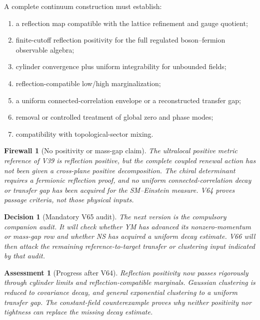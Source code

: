 \documentclass[11pt]{article}
\newtheorem{assessment}[theorem]{Assessment}
\newtheorem{firewall}[theorem]{Firewall}
\newtheorem{decision}[theorem]{Decision}
\begin{document}
\begin{ledger}
\label{led:v11v64-data}
A complete continuum construction must establish:
\begin{enumerate}
\item a reflection map compatible with the lattice refinement and
gauge quotient;
\item finite-cutoff reflection positivity for the full regulated
boson--fermion observable algebra;
\item cylinder convergence plus uniform integrability for unbounded
fields;
\item reflection-compatible low/high marginalization;
\item a uniform connected-correlation envelope or a reconstructed
transfer gap;
\item removal or controlled treatment of global zero and phase modes;
\item compatibility with topological-sector mixing.
\end{enumerate}
\end{ledger}

\begin{firewall}[No positivity or mass-gap claim]
\label{fire:v11v64-boundary}
The ultralocal positive metric reference of V39 is reflection positive,
but the complete coupled renewal action has not been given a
cross-plane positive decomposition.  The chiral determinant requires
a fermionic reflection proof, and no uniform connected-correlation
decay or transfer gap has been acquired for the SM--Einstein measure.
V64 proves passage criteria, not those physical inputs.
\end{firewall}

\begin{decision}[Mandatory V65 audit]
\label{dec:v11v64-next}
The next version is the compulsory companion audit.  It will check
whether YM has advanced its nonzero-momentum or mass-gap row and
whether NS has acquired a uniform decay estimate.  V66 will then
attack the remaining reference-to-target transfer or clustering input
indicated by that audit.
\end{decision}

\begin{assessment}[Progress after V64]
\label{ass:v11v64-status}
Reflection positivity now passes rigorously through cylinder limits and
reflection-compatible marginals.  Gaussian clustering is reduced to
covariance decay, and general exponential clustering to a uniform
transfer gap.  The constant-field counterexample proves why neither
positivity nor tightness can replace the missing decay estimate.
\end{assessment}
\end{document}
